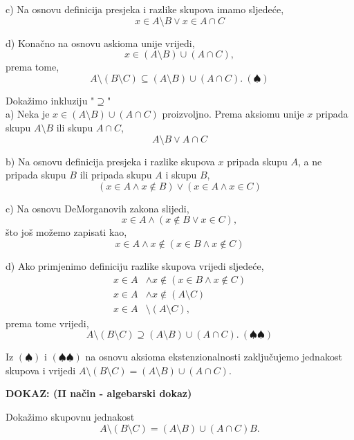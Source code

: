 \documentclass{article}
\begin{document}
        \noindent
        c) Na osnovu definicija presjeka i razlike skupova imamo sljedeće,
        $$x\in A\setminus B\vee x\in A\cap C$$
        \smallskip

        \noindent
        d) Konačno na osnovu askioma unije vrijedi,
        $$x\in (A\setminus B)\cup (A\cap C),$$
        prema tome,
        $$A\setminus (B\setminus C)\subseteq (A\setminus B)\cup (A\cap C).\ (\spadesuit)$$
        \bigskip

        \noindent
        Dokažimo inkluziju "$\supseteq $"\\
        a) Neka je $x\in (A\setminus B)\cup (A\cap C)$ proizvoljno. Prema aksiomu unije $x$ pripada skupu $A\setminus B$ ili skupu $A\cap C$,
        $$A\setminus B\vee A\cap C$$
        \smallskip

        \noindent
        b) Na osnovu definicija presjeka i razlike skupova $x$ pripada skupu $A$, a ne pripada skupu $B$ ili pripada skupu $A$ i skupu $B$,
        $$(x\in A\land x\notin B)\vee (x\in A\land x\in C)$$
        \smallskip

        \noindent
        c) Na osnovu DeMorganovih zakona slijedi,
        $$x\in A\land (x\notin B\vee x\in C),$$
        što još možemo zapisati kao,
        $$x\in A\land x\notin (x\in B\land x\notin C)$$
        \smallskip

        \newpage\noindent\thispagestyle{empty}
        d) Ako primjenimo definiciju razlike skupova vrijedi sljedeće,
        \begin{align*}
            x\in A &\land x\notin (x\in B\land x\notin C)\\
            x\in A &\land x\notin(A\setminus C)\\
            x\in A &\setminus (A\setminus C),
        \end{align*}
        prema tome vrijedi,
        $$A\setminus (B\setminus C)\supseteq (A\setminus B)\cup (A\cap C).\ (\spadesuit\spadesuit)$$
        \medskip

        \noindent
        Iz $(\spadesuit)$ i $(\spadesuit\spadesuit)$ na osnovu aksioma ekstenzionalnosti zaključujemo jednakost skupova i vrijedi $A\setminus (B\setminus C)=(A\setminus B)\cup (A\cap C).$
        \bigskip
    
        \begin{flushleft}
            \textbf{DOKAZ: (II način - algebarski dokaz)}
        \end{flushleft}
    
        \noindent
            Dokažimo skupovnu jednakost
            $$A\setminus (B\setminus C)=(A\setminus B)\cup (A\cap C)B.$$
    
\end{document}
